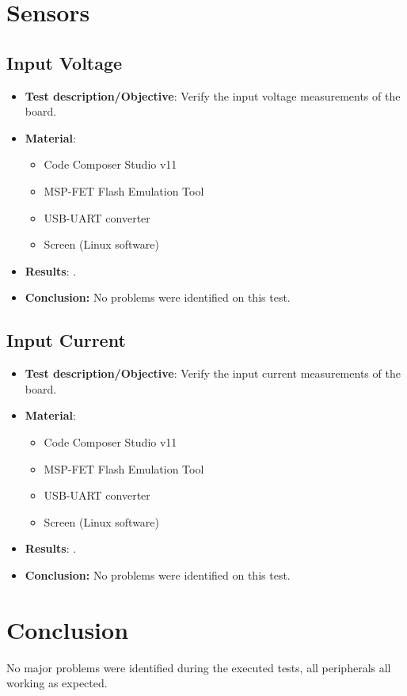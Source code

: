 \section{Sensors}

\subsection{Input Voltage}

\begin{itemize}
    \item \textbf{Test description/Objective}: Verify the input voltage measurements of the board.
    \item \textbf{Material}:
        \begin{itemize}
            \item Code Composer Studio v11
            \item MSP-FET Flash Emulation Tool
            \item USB-UART converter
            \item Screen (Linux software)
        \end{itemize}
    \item \textbf{Results}: .
    \item \textbf{Conclusion:} No problems were identified on this test.
\end{itemize}

\subsection{Input Current}

\begin{itemize}
    \item \textbf{Test description/Objective}: Verify the input current measurements of the board.
    \item \textbf{Material}:
        \begin{itemize}
            \item Code Composer Studio v11
            \item MSP-FET Flash Emulation Tool
            \item USB-UART converter
            \item Screen (Linux software)
        \end{itemize}
    \item \textbf{Results}: .
    \item \textbf{Conclusion:} No problems were identified on this test.
\end{itemize}

\section{Conclusion}

No major problems were identified during the executed tests, all peripherals all working as expected.